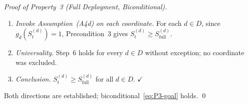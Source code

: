 \documentclass[12pt,openany]{book}
\numberwithin{equation}{chapter}
\theoremstyle{plain}
\theoremstyle{definition}
\theoremstyle{remark}
\def\mathcal#1{#1}%
\begin{document}
\begin{proof}[Proof of Property~3 (Full Deployment, Biconditional)]
\begin{enumerate}
  \item \emph{Invoke Assumption~(A4d) on each coordinate.}
        For each $d\in\mathcal{D}$, since
        $g_d\!\left(\mathcal{S}_t^{(d)}\right)=1$,
        Precondition~3 gives
        $\mathcal{S}_t^{(d)}\geq\mathcal{S}_{\mathrm{full}}^{(d)}$.

  \item \emph{Universality.}
        Step~6 holds for every $d\in\mathcal{D}$ without
        exception; no coordinate was excluded.

  \item \emph{Conclusion.}
        $\mathcal{S}_t^{(d)}\geq\mathcal{S}_{\mathrm{full}}^{(d)}$
        for all $d\in\mathcal{D}$.
        \hfill$\checkmark$
\end{enumerate}

\medskip\noindent
Both directions are established; biconditional~\eqref{eq:P3-goal}
holds. \qed
\end{proof}
\end{document}
